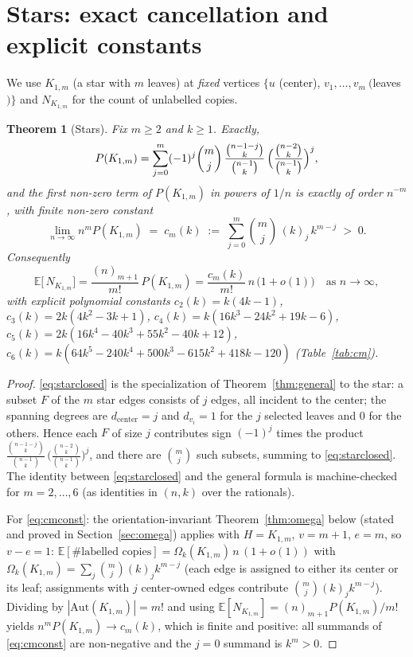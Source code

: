\documentclass[11pt,a4paper]{article}
\newtheorem{theorem}{Theorem}[section]
\theoremstyle{definition}
\theoremstyle{definition}
\begin{document}
\section{Stars: exact cancellation and explicit constants}\label{sec:stars}

We use $K_{1,m}$ (a star with $m$ leaves) at \emph{fixed} vertices
$\{u$ (center), $v_1,\dots,v_m\ ($leaves$)\}$ and $N_{K_{1,m}}$ for the count of
unlabelled copies.

\begin{theorem}[Stars]\label{thm:stars}
Fix $m\ge2$ and $k\ge1$. Exactly,
\begin{equation}\label{eq:starclosed}
P(K_{1,m})
=\sum_{j=0}^{m}(-1)^{j}\binom{m}{j}\,\frac{\binom{n-1-j}{k}}{\binom{n-1}{k}}\,
\Bigl(\frac{\binom{n-2}{k}}{\binom{n-1}{k}}\Bigr)^{j},
\end{equation}
and the first non-zero term of $P(K_{1,m})$ in powers of $1/n$ is \emph{exactly of
order} $n^{-m}$, with finite non-zero constant
\begin{equation}\label{eq:cmconst}
\lim_{n\to\infty} n^{m} P(K_{1,m}) \;=\; c_m(k)
\;:=\;\sum_{j=0}^{m}\binom{m}{j}\,(k)_{j}\,k^{m-j} \;>\;0.
\end{equation}
Consequently
\[
\mathbb E\bigl[\,N_{K_{1,m}}\bigr]=\frac{(n)_{m+1}}{m!}\,P(K_{1,m})
=\frac{c_m(k)}{m!}\,n\,\bigl(1+o(1)\bigr) \quad\text{as }n\to\infty,
\]
with explicit polynomial constants $c_2(k)=k(4k-1)$,
$c_3(k)=2k(4k^2-3k+1)$, $c_4(k)=k(16k^3-24k^2+19k-6)$, $c_5(k)=
2k(16k^4-40k^3+55k^2-40k+12)$, $c_6(k)=k(64k^5-240k^4+500k^3-615k^2+418k-120)$
(Table~\ref{tab:cm}).
\end{theorem}

\begin{proof}[Proof]
\eqref{eq:starclosed} is the specialization of Theorem~\ref{thm:general} to the
star: a subset $F$ of the $m$ star edges consists of $j$ edges, all incident to the
center; the spanning degrees are $d_{\text{center}} = j$ and $d_{v_i}=1$ for the
$j$ selected leaves and $0$ for the others. Hence each $F$ of size $j$ contributes
sign $(-1)^{j}$ times the product
$\frac{\binom{n-1-j}{k}}{\binom{n-1}{k}}\,
\bigl(\frac{\binom{n-2}{k}}{\binom{n-1}{k}}\bigr)^{j}$, and there are
$\binom{m}{j}$ such subsets, summing to \eqref{eq:starclosed}. The identity between
\eqref{eq:starclosed} and the general formula is machine-checked for
$m=2,\dots,6$ (as identities in $(n,k)$ over the rationals).

For \eqref{eq:cmconst}: the orientation-invariant Theorem~\ref{thm:omega} below
(stated and proved in Section~\ref{sec:omega}) applies with $H=K_{1,m}$,
$v=m+1$, $e=m$, so $v-e=1$:
$\mathbb E[\#\text{labelled copies}]=\Omega_k(K_{1,m})\,n\,(1+o(1))$ with
$\Omega_k(K_{1,m})=\sum_{j}\binom{m}{j}(k)_{j}k^{m-j}$ (each edge is assigned to
either its center or its leaf; assignments with $j$ center-owned edges contribute
$\binom{m}{j}(k)_{j}k^{m-j}$). Dividing by $|\mathrm{Aut}(K_{1,m})|=m!$ and using
$\mathbb E[N_{K_{1,m}}]=(n)_{m+1}P(K_{1,m})/m!$ yields
$n^{m}P(K_{1,m})\to c_m(k)$, which is finite and positive: all summands of
\eqref{eq:cmconst} are non-negative and the $j=0$ summand is $k^{m}>0$.
\end{proof}
\end{document}
